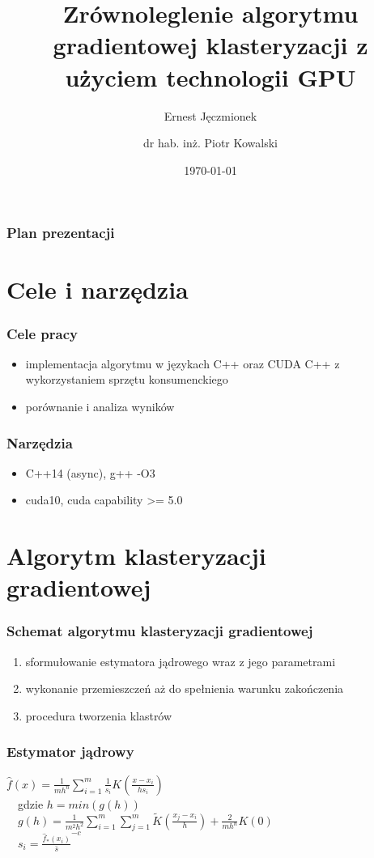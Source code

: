\documentclass{beamer}
\title{Zrównoleglenie algorytmu gradientowej klasteryzacji z użyciem technologii GPU}
\subtitle{Ernest Jęczmionek}
\author{dr hab. inż. Piotr Kowalski}
\institute{Wydział Fizyki i Informatyki Stosowanej}
\date{\today}
\begin{document}
\titleframe[pl]

\begin{frame}\frametitle{Plan prezentacji} %
	\tableofcontents
\end{frame}




\section{Cele i narzędzia}
\begin{frame}\frametitle{Cele pracy}
\begin{itemize}
\item implementacja algorytmu w językach C++ oraz CUDA C++ z wykorzystaniem sprzętu konsumenckiego
\item porównanie i analiza wyników
\end{itemize}
\end{frame}

\begin{frame}\frametitle{Narzędzia}
\begin{itemize}
\item C++14 (async), g++ -O3
\item cuda10, cuda capability >= 5.0
\end{itemize}
\end{frame}




\section{Algorytm klasteryzacji gradientowej}
\begin{frame}\frametitle{Schemat algorytmu klasteryzacji gradientowej}
\begin{enumerate}
	\item sformułowanie estymatora jądrowego wraz z jego parametrami
	\item wykonanie przemieszczeń aż do spełnienia warunku zakończenia
	\item procedura tworzenia klastrów
\end{enumerate}
\end{frame}

\begin{frame}\frametitle{Estymator jądrowy}
\begin{center}
$\hat{f}(x)=\frac{1}{mh^n} \displaystyle \sum_{i=1}^{m} \frac{1}{s_i}K(\frac{x-x_i}{hs_i})$ \\~\
gdzie $h = min(g(h))$ \\~\
$g(h)=\frac{1}{m^2h^2}\displaystyle\sum_{i=1}^{m} \displaystyle\sum_{j=1}^{m} \widetilde{K}(\frac{x_j - x_i}{h}) + \frac{2}{mh^n}K(0)$ \\~\
$s_i = {\frac{\hat{f}_*(x_i)}{\bar{s}}}^{-c}$ \\~\
\end{center}
\end{frame}
\end{document}
